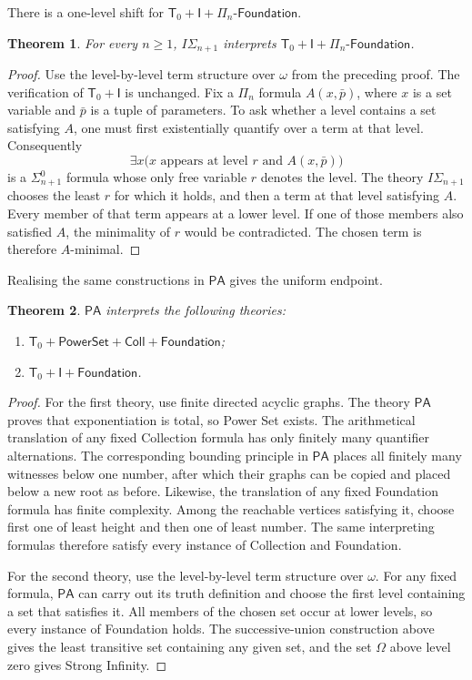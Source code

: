 \documentclass[11pt,a4paper]{article}
\newcommand{\PA}{\mathsf{PA}}
\newcommand{\IS}[1]{I\Sigma_{#1}}
\newcommand{\Tzero}{\mathsf T_{0}}
\newcommand{\Fnd}[1]{#1\text{-}\mathsf{Foundation}}
\newcommand{\Pow}{\mathsf{PowerSet}}
\newcommand{\Inf}{\mathsf I}
\theoremstyle{plain}
\newtheorem{theorem}{Theorem}[section]
\theoremstyle{definition}
\theoremstyle{remark}
\begin{document}
There is a one-level shift for \(\Tzero+\Inf+\Fnd{\Pi_n}\).
\begin{theorem}
  For every \(n\geq1\), \(\IS{n+1}\) interprets \(\Tzero+\Inf+\Fnd{\Pi_n}\).
\end{theorem}
\begin{proof}
  Use the level-by-level term structure over \(\omega\) from the preceding proof. The verification of \(\Tzero+\Inf\) is unchanged. Fix a \(\Pi_n\) formula \(A(x,\bar p)\), where \(x\) is a set variable and \(\bar p\) is a tuple of parameters. To ask whether a level contains a set satisfying \(A\), one must first existentially quantify over a term at that level. Consequently
  \[
    \exists x\bigl(x\text{ appears at level }r\text{ and }A(x,\bar p)\bigr)
  \]
  is a \(\Sigma_{n+1}^0\) formula whose only free variable \(r\) denotes the level. The theory \(I\Sigma_{n+1}\) chooses the least \(r\) for which it holds, and then a term at that level satisfying \(A\). Every member of that term appears at a lower level. If one of those members also satisfied \(A\), the minimality of \(r\) would be contradicted. The chosen term is therefore \(A\)-minimal.
\end{proof}

Realising the same constructions in \(\PA\) gives the uniform endpoint.
\begin{theorem}
  \(\PA\) interprets the following theories:
  \begin{enumerate}
    \item \(\Tzero+\Pow+\mathsf{Coll}+\mathsf{Foundation}\);
    \item \(\Tzero+\Inf+\mathsf{Foundation}\).
  \end{enumerate}
\end{theorem}
\begin{proof}
  For the first theory, use finite directed acyclic graphs. The theory \(\PA\) proves that exponentiation is total, so Power Set exists. The arithmetical translation of any fixed Collection formula has only finitely many quantifier alternations. The corresponding bounding principle in \(\PA\) places all finitely many witnesses below one number, after which their graphs can be copied and placed below a new root as before. Likewise, the translation of any fixed Foundation formula has finite complexity. Among the reachable vertices satisfying it, choose first one of least height and then one of least number. The same interpreting formulas therefore satisfy every instance of Collection and Foundation.

  For the second theory, use the level-by-level term structure over \(\omega\). For any fixed formula, \(\PA\) can carry out its truth definition and choose the first level containing a set that satisfies it. All members of the chosen set occur at lower levels, so every instance of Foundation holds. The successive-union construction above gives the least transitive set containing any given set, and the set \(\Omega\) above level zero gives Strong Infinity.
\end{proof}
\end{document}
